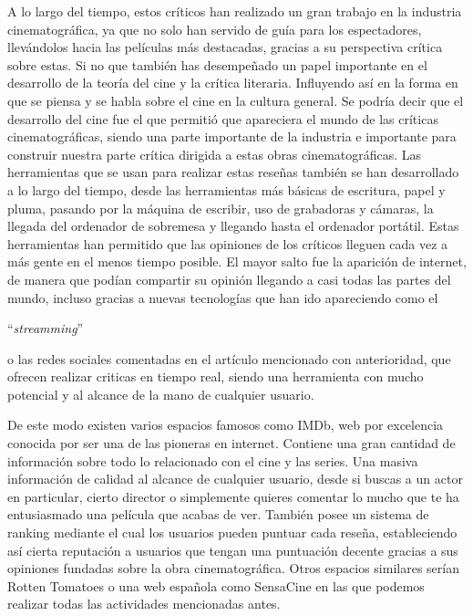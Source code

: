 A lo largo del tiempo, estos críticos han realizado un gran trabajo en la industria cinematográfica, ya 
que no solo han servido de guía para los espectadores, llevándolos hacia las películas más destacadas, 
gracias a su perspectiva crítica sobre estas. Si no que también has desempeñado un papel importante en 
el desarrollo de la teoría del cine y la crítica literaria. Influyendo así en la forma en que se piensa 
y se habla sobre el cine en la cultura general. Se podría decir que el desarrollo del cine fue el que 
permitió que apareciera el mundo de las críticas cinematográficas, siendo una parte importante de la 
industria e importante para construir nuestra parte crítica dirigida a estas obras cinematográficas. Las 
herramientas que se usan para realizar estas reseñas también se han desarrollado a lo largo del tiempo, 
desde las herramientas más básicas de escritura, papel y pluma, pasando por la máquina de escribir, uso 
de grabadoras y cámaras, la llegada del ordenador de sobremesa y llegando hasta el ordenador portátil. 
Estas herramientas han permitido que las opiniones de los críticos lleguen cada vez a más gente en el 
menos tiempo posible. El mayor salto fue la aparición de internet, de manera que podían compartir su 
opinión llegando a casi todas las partes del mundo, incluso gracias a nuevas tecnologías que han ido 
apareciendo como el \begin{otherlanguage}{english}``\textit{streamming}''\end{otherlanguage} o las redes 
sociales comentadas en el artículo mencionado con anterioridad, que ofrecen realizar criticas en tiempo 
real, siendo una herramienta con mucho potencial y al alcance de la mano de cualquier usuario.

De este modo existen varios espacios famosos como IMDb\cite{IMDbWeb}, web por excelencia conocida por 
ser una de las pioneras en internet. Contiene una gran cantidad de información sobre todo lo relacionado 
con el cine y las series. Una masiva información de calidad al alcance de cualquier usuario, desde si 
buscas a un actor en particular, cierto director o simplemente quieres comentar lo mucho que te ha 
entusiasmado una película que acabas de ver. También posee un sistema de ranking mediante el cual los 
usuarios pueden puntuar cada reseña, estableciendo así cierta reputación a usuarios que tengan una 
puntuación decente gracias a sus opiniones fundadas sobre la obra cinematográfica. Otros espacios 
similares serían Rotten Tomatoes\cite{RottenTWeb} o una web española como SensaCine\cite{SSweb} en las 
que podemos realizar todas las actividades mencionadas antes.

